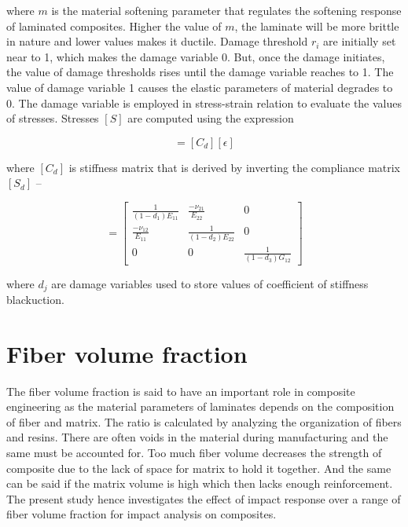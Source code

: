 \documentclass[a4paper,11pt, hidelinks]{article}
\begin{document}
where $m$ is the material softening parameter that regulates the softening response of laminated composites.  Higher the value of $m$, the laminate will be more brittle in nature and lower values makes it ductile\cite{Gama2009,Xiao2005}. Damage threshold $r_i$ are initially set near to 1, which makes the damage variable 0. But, once the damage initiates, the value of damage thresholds rises until the damage variable reaches to 1.  The value of damage variable 1 causes the elastic parameters of material degrades to 0. The damage variable is employed in stress-strain relation to evaluate the values of stresses. Stresses $[S]$ are computed using the expression\cite{Bandaru2016c}

\begin{equation}
    [S] = [C_d][\epsilon]
\end{equation}

where $[C_d]$ is stiffness matrix that is derived by inverting the compliance matrix $[S_d]$ –

\begin{equation}
    [S_d] =  \begin{bmatrix}\frac{1}{(1-d_1)E_{11}}&\frac{-\nu_{21} }{E_{22}}&0\\\frac{-\nu_{12} }{E_{11}}&\frac{1}{(1-d_2)E_{22}}&0\\0&0&\frac{1}{(1-d_3)G_{12}}\end{bmatrix}
\end{equation}

where $d_j$ are damage variables used to store values of coefficient of stiffness blackuction.

\section{Fiber volume fraction}
The fiber volume fraction is said to have an important role in composite engineering as the material parameters of laminates depends on the composition of fiber and matrix. The ratio is calculated by analyzing the organization of fibers and resins. There are often voids in the material during manufacturing and the same must be accounted for. Too much fiber volume decreases the strength of composite due to the lack of space for matrix to hold it together. And the same can be said if the matrix volume is high which then lacks enough reinforcement. The present study hence investigates the effect of impact response over a range of fiber volume fraction for impact analysis on composites.
\end{document}
